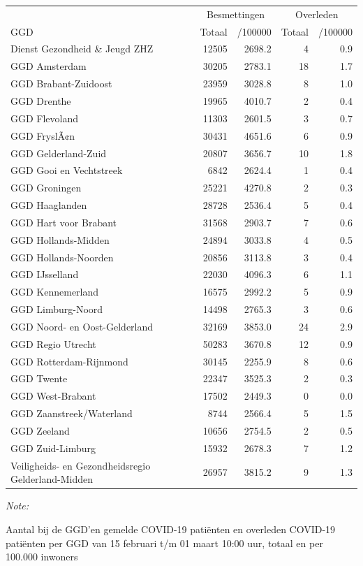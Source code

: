 \documentclass[
  english,
  man,floatsintext]{apa6}
\begin{document}
\begin{table}
\centering\begingroup\fontsize{10}{12}\selectfont

\begin{threeparttable}
\begin{tabular}{lrrrr}
\toprule
\multicolumn{1}{c}{ } & \multicolumn{2}{c}{Besmettingen} & \multicolumn{2}{c}{Overleden} \\
\cmidrule(l{3pt}r{3pt}){2-3} \cmidrule(l{3pt}r{3pt}){4-5}
GGD & Totaal & /100000 & Totaal & /100000\\
\midrule
Dienst Gezondheid \& Jeugd ZHZ & 12505 & 2698.2 & 4 & 0.9\\
GGD Amsterdam & 30205 & 2783.1 & 18 & 1.7\\
GGD Brabant-Zuidoost & 23959 & 3028.8 & 8 & 1.0\\
GGD Drenthe & 19965 & 4010.7 & 2 & 0.4\\
GGD Flevoland & 11303 & 2601.5 & 3 & 0.7\\
GGD FryslÃ¢n & 30431 & 4651.6 & 6 & 0.9\\
GGD Gelderland-Zuid & 20807 & 3656.7 & 10 & 1.8\\
GGD Gooi en Vechtstreek & 6842 & 2624.4 & 1 & 0.4\\
GGD Groningen & 25221 & 4270.8 & 2 & 0.3\\
GGD Haaglanden & 28728 & 2536.4 & 5 & 0.4\\
GGD Hart voor Brabant & 31568 & 2903.7 & 7 & 0.6\\
GGD Hollands-Midden & 24894 & 3033.8 & 4 & 0.5\\
GGD Hollands-Noorden & 20856 & 3113.8 & 3 & 0.4\\
GGD IJsselland & 22030 & 4096.3 & 6 & 1.1\\
GGD Kennemerland & 16575 & 2992.2 & 5 & 0.9\\
GGD Limburg-Noord & 14498 & 2765.3 & 3 & 0.6\\
GGD Noord- en Oost-Gelderland & 32169 & 3853.0 & 24 & 2.9\\
GGD Regio Utrecht & 50283 & 3670.8 & 12 & 0.9\\
GGD Rotterdam-Rijnmond & 30145 & 2255.9 & 8 & 0.6\\
GGD Twente & 22347 & 3525.3 & 2 & 0.3\\
GGD West-Brabant & 17502 & 2449.3 & 0 & 0.0\\
GGD Zaanstreek/Waterland & 8744 & 2566.4 & 5 & 1.5\\
GGD Zeeland & 10656 & 2754.5 & 2 & 0.5\\
GGD Zuid-Limburg & 15932 & 2678.3 & 7 & 1.2\\
Veiligheids- en Gezondheidsregio Gelderland-Midden & 26957 & 3815.2 & 9 & 1.3\\
\bottomrule
\end{tabular}
\begin{tablenotes}
\item \textit{Note: } 
\item Aantal bij de GGD’en gemelde COVID-19 patiënten en overleden COVID-19 patiënten per GGD van 15 februari t/m 01 maart 10:00 uur, totaal en per 100.000 inwoners
\end{tablenotes}
\end{threeparttable}
\endgroup{}
\end{table}
\end{document}
